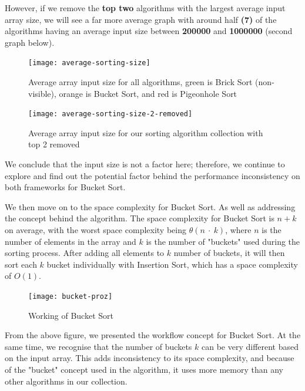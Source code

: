 However, if we remove the \textbf{top two} algorithms with the largest average input array size, we will see a far more average graph with around half \textbf{(7)} of the algorithms having an average input size between \textbf{200000} and \textbf{1000000} (second graph below).

\newpage
\bigskip
\begin{figure}[hp]
\centering
\texttt{[image: average-sorting-size]}
\caption{\footnotesize{Average array input size for all algorithms, green is Brick Sort (non-visible), orange is Bucket Sort, and red is Pigeonhole Sort}}
\captionsetup{aboveskip=0pt,font=it}
\end{figure}
\bigskip

\bigskip
\begin{figure}[hp]
\centering
\texttt{[image: average-sorting-size-2-removed]}
\caption{\footnotesize{Average array input size for our sorting algorithm collection with top 2 removed}}
\captionsetup{aboveskip=0pt,font=it}
\end{figure}
\bigskip

We conclude that the input size is not a factor here; therefore, we continue to explore and find out the potential factor behind the performance inconsistency on both frameworks for Bucket Sort.

We then move on to the space complexity for Bucket Sort. As well as addressing the concept behind the algorithm. The space complexity for Bucket Sort is \(n + k\) on average, with the worst space complexity being \(\theta(n\ \cdot\ k)\), where \(n\) is the number of elements in the array and \(k\) is the number of "buckets" used during the sorting process. After adding all elements to \(k\) number of buckets, it will then sort each \(k\) bucket individually with Insertion Sort, which has a space complexity of \(O(1)\).

\bigskip
\begin{figure}[hp]
\centering
\texttt{[image: bucket-proz]}
\caption{\footnotesize{Working of Bucket Sort \cite{res1}}}
\captionsetup{aboveskip=0pt,font=it}
\end{figure}
\bigskip

From the above figure, we presented the workflow concept for Bucket Sort. At the same time, we recognise that the number of buckets \(k\) can be very different based on the input array. This adds inconsistency to its space complexity, and because of the "bucket" concept used in the algorithm, it uses more memory than any other algorithms in our collection.

